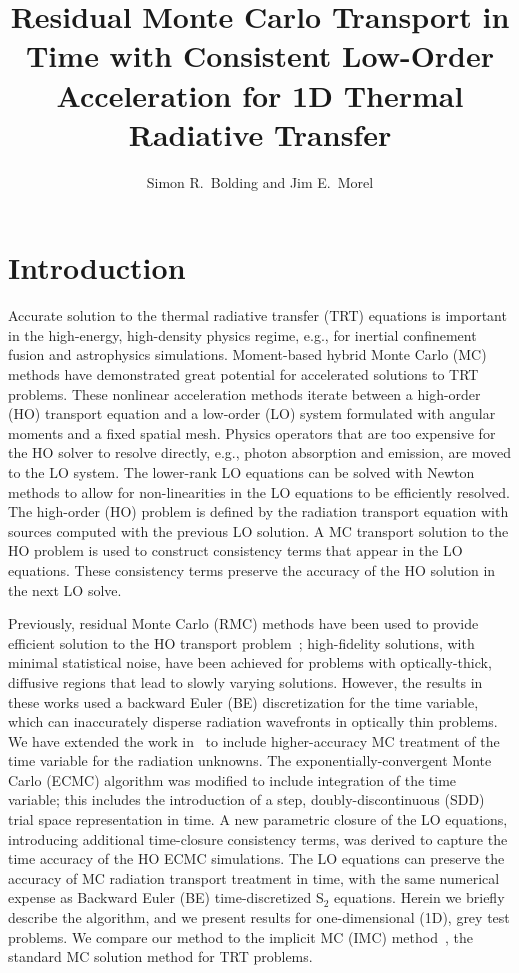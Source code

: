 \documentclass{anstrans}
\title{Residual Monte Carlo Transport in Time with Consistent Low-Order Acceleration for
    1D Thermal Radiative Transfer}
\author{Simon R.~Bolding and Jim E.~Morel}
\institute{Texas A\&M University Nuclear Engineering Department, 
}
\begin{document}
\section{Introduction}

Accurate solution to the thermal radiative transfer (TRT) equations is important in the
high-energy, high-density physics regime, e.g., for inertial
confinement fusion and astrophysics simulations.  Moment-based hybrid Monte Carlo (MC)
methods have demonstrated great potential for accelerated
solutions to TRT problems.   These nonlinear acceleration methods iterate between a
high-order (HO) transport equation and a low-order (LO) system formulated with angular moments
and a fixed spatial mesh.  Physics operators that
are too expensive for the HO solver to resolve directly, e.g., photon absorption and emission,
are moved to the LO system. The lower-rank LO equations can be solved with Newton
methods to allow for non-linearities in the LO equations to be efficiently
resolved.  The high-order (HO) problem is defined by the radiation transport equation with
sources computed with the previous LO solution. A MC transport solution to the HO
problem is used to construct consistency terms that appear in the LO equations. These consistency terms preserve the accuracy of the HO
solution in the next LO solve.

Previously, residual Monte Carlo (RMC) methods have been used to provide efficient
solution to the HO transport problem~\cite{rmc,bolding_nse}; high-fidelity solutions,
with minimal statistical noise, have been achieved for problems with optically-thick, diffusive
regions that lead to slowly varying
solutions.  However, the results in these works used a backward
Euler (BE) discretization for the time variable, which can inaccurately disperse radiation
wavefronts in optically thin problems. We have extended the work
in~\cite{bolding_nse} to include higher-accuracy MC treatment of the time variable for the
radiation unknowns. The exponentially-convergent Monte Carlo (ECMC)
algorithm was modified to include integration of the time variable;
this includes the introduction of a step, doubly-discontinuous (SDD) trial space representation
in time.  A new
parametric closure of the LO equations, introducing additional time-closure consistency
terms, was derived to capture the time accuracy of the HO
ECMC simulations.  The LO equations can preserve the accuracy of MC radiation transport treatment in
time, with the same numerical expense as Backward Euler (BE) time-discretized S$_2$
equations. 
Herein we briefly describe the algorithm, and we present results for
one-dimensional (1D), grey test problems.  We compare our method to the implicit MC
(IMC) method~\cite{wollaber_review}, the standard MC solution
method for TRT problems.
\end{document}
